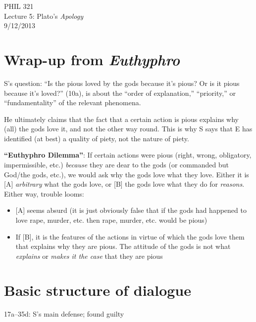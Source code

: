 \documentclass[11pt]{article}
\begin{document}
\thispagestyle{empty}
\begin{center} \LARGE{PHIL 321\\ Lecture 5: Plato's \emph{Apology}}\\ \vspace*{2mm}
\large{9/12/2013}\end{center}
\thispagestyle{empty}\vspace*{3mm}
\vspace*{-8mm}
\section*{Wrap-up from \emph{Euthyphro}}

\noindent S's question: ``Is the pious loved by the gods because it's pious? Or is it pious because it's loved?'' (10a), is about the ``order of explanation,'' ``priority,'' or ``fundamentality'' of the relevant phenomena.
\vspace*{2mm}

\noindent He ultimately claims that the fact that a certain action is pious explains why (all) the gods love it, and not the other way round. This is why S says that E has identified (at best) a quality of piety, not the nature of piety.
\vspace*{2mm}

\noindent \textbf{``Euthyphro Dilemma''}: If certain actions were pious (right, wrong, obligatory, impermissible, etc.) \emph{because} they are dear to the gods (or commanded but God/the gods, etc.), we would ask why the gods love what they love. Either it is [A] \emph{arbitrary} what the gods love, or [B] the gods love what they do for \emph{reasons}. Either way, trouble looms:\begin{itemize}\item{[A] seems absurd (it is just obviously false that if the gods had happened to love rape, murder, etc. then rape, murder, etc. would be pious)}\item{If [B], it is the features of the actions in virtue of which the gods love them that explains why they are pious. The attitude of the gods is not what \emph{explains} or \emph{makes it the case} that they are pious} \end{itemize}
\vspace*{-5mm}
\section*{Basic structure of dialogue}
17a--35d: S's main defense; found guilty
\vspace*{2mm}
\end{document}
